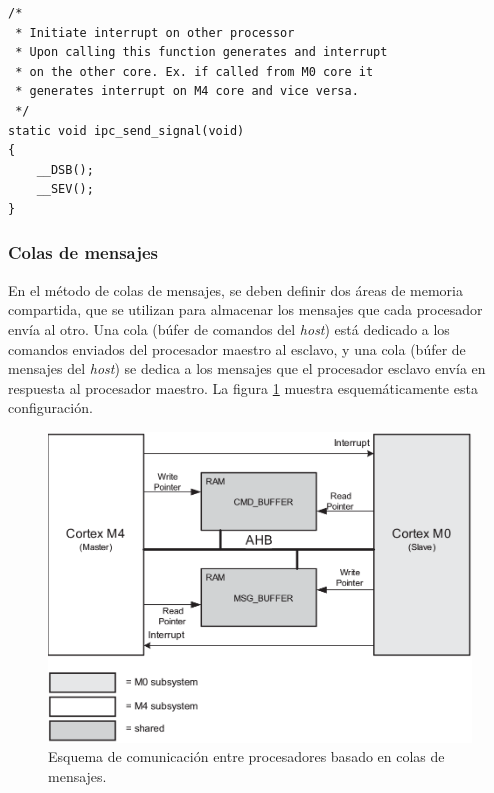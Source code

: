 \begin{lstlisting}[caption={Función ipc\_send\_signal que permite generar una interrupción en el otro procesador.},label={lst:ipc_send_signal}]
/*
 * Initiate interrupt on other processor
 * Upon calling this function generates and interrupt 
 * on the other core. Ex. if called from M0 core it 
 * generates interrupt on M4 core and vice versa.
 */
static void ipc_send_signal(void)
{
  	__DSB();
  	__SEV();
}
\end{lstlisting}

\subsubsection{Colas de mensajes}
\label{subsubsec:colas}

En el método de colas de mensajes, se deben definir dos áreas de memoria compartida, que se utilizan para almacenar los mensajes que cada procesador envía al otro. Una cola (búfer de comandos del \textit{host}) está dedicado a los comandos enviados del procesador maestro al esclavo, y una cola (búfer de mensajes del \textit{host}) se dedica a los mensajes que el procesador esclavo envía en respuesta al procesador maestro. La figura \ref{fig:IPC} muestra esquemáticamente esta configuración.

\vspace{10px}

\begin{figure}[ht]
	\centering
	\includegraphics[width=.8\textwidth]{./Figures/IPC.png}
	\caption[Esquema de comunicación entre procesadores]{Esquema de comunicación entre procesadores basado en colas de mensajes\protect\footnotemark.}
	\label{fig:IPC}
\end{figure}

\vspace{10px}
\vfill
{}


